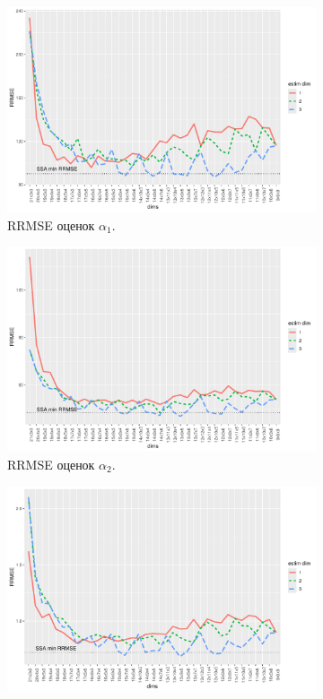 \documentclass[specialist,
  substylefile=spbu.rtx,
subf,href,colorlinks=true, 12pt]{disser}
\theoremstyle{plain}
\theoremstyle{definition}
\theoremstyle{remark}
\begin{document}
\begin{figure}[!ht]
  \centering
  \begin{subfigure}{0.49\linewidth}
    \includegraphics[width=\linewidth]{rate1_dims.pdf}
    \caption{RRMSE оценок $\alpha_1$.}
    \label{fig:rate1_dims}
  \end{subfigure}
  \begin{subfigure}{0.49\linewidth}
    \includegraphics[width=\linewidth]{rate2_dims.pdf}
    \caption{RRMSE оценок $\alpha_2$.}
    \label{fig:rate2_dims}
  \end{subfigure}
  \begin{subfigure}{0.49\linewidth}
    \includegraphics[width=\linewidth]{freq1_dims.pdf}

\end{subfigure}
\end{figure}
\end{document}
